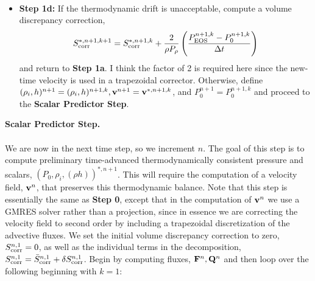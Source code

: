 \documentclass[final]{siamltex}
\def\Fb {{\bf F}}
\def\Qb {{\bf Q}}
\def\vb {{\bf v}}
\begin{document}
\begin{itemize}
\begin{eqnarray}
\end{eqnarray}
\item {\bf Step 1d:} If the thermodynamic drift is unacceptable, compute a volume 
discrepancy correction,
\begin{equation}
S_{\rm corr}^{*,n+1,k+1} = S_{\rm corr}^{*,n+1,k} + \frac{2}{\rho P_\rho}\left(\frac{P_{\rm EOS}^{n+1,k} - P_0^{n+1,k}}{\Delta t}\right)
\end{equation}
and return to {\bf Step 1a}.  I think the factor of 2 is required here since the new-time
velocity is used in a trapezoidal corrector.  Otherwise, define 
$(\rho_i,h)^{n+1} = (\rho_i,h)^{n+1,k}, \vb^{n+1} = \vb^{*,n+1,k}$, and 
$P_0^{n+1} = P_0^{n+1,k}$ and proceed to the {\bf Scalar Predictor Step}.\\
\end{itemize}
{\bf Scalar Predictor Step.}\\ \\
We are now in the next time step, so we increment $n$.
The goal of this step is to compute preliminary time-advanced thermodynamically
consistent pressure and scalars, $(P_0,\rho_i,(\rho h))^{*,n+1}$.  This will
require the computation of a velocity field, $\vb^n$, that preserves this
thermodynamic balance.  Note that this step is essentially the same as
{\bf Step 0}, except that in the computation of $\vb^n$ we use a GMRES
solver rather than a projection, since in essence we are correcting the velocity
field to second order by including a trapezoidal discretization of the advective fluxes.
We set the initial volume discrepancy correction to zero, 
$S_{\rm corr}^{n,1} = 0$, as well as the individual terms in the decomposition,
$S_{\rm corr}^{n,1} = \bar{S}_{\rm corr}^{n,1} + \delta S_{\rm corr}^{n,1}$.
Begin by computing fluxes, $\Fb^n, \Qb^n$ and then
loop over the following beginning with $k=1$:\\
\end{document}
